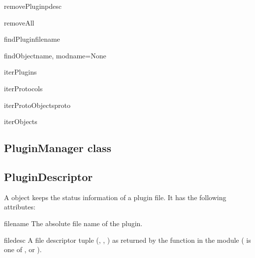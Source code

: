 \begin{funcdesc}{removePlugin}{pdesc}
\end{funcdesc}

\begin{funcdesc}{removeAll}{}
\end{funcdesc}

\begin{funcdesc}{findPlugin}{filename}
\end{funcdesc}

\begin{funcdesc}{findObject}{name, modname=None}
\end{funcdesc}

\begin{funcdesc}{iterPlugins}{}
\end{funcdesc}

\begin{funcdesc}{iterProtocols}{}
\end{funcdesc}

\begin{funcdesc}{iterProtoObjects}{proto}
\end{funcdesc}

\begin{funcdesc}{iterObjects}{}
\end{funcdesc}

\subsection{PluginManager class}

\subsection{PluginDescriptor}

A  object keeps the status information
of a plugin file. It has the following attributes:

\begin{datadesc}{filename}
The absolute file name of the plugin.
\end{datadesc}

\begin{datadesc}{filedesc}
A file descriptor tuple (, , ) as
returned by the  function in the 
module ( is one of ,  
or ).
\end{datadesc}

